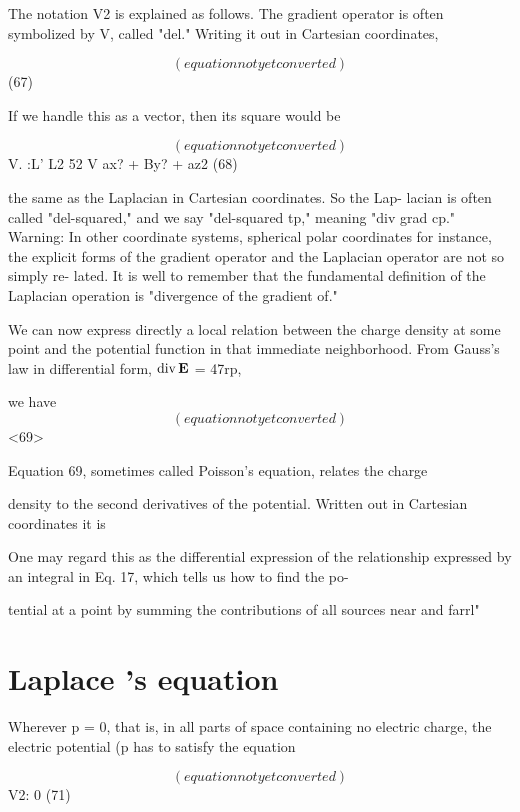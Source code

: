The notation V2 is explained as follows. The gradient operator is
often symbolized by V, called "del." Writing it out in Cartesian
coordinates,

\begin{equation}
(equation not yet converted)
\end{equation}
(67)

If we handle this as a vector, then its square would be

\begin{equation}
(equation not yet converted)
\end{equation}
V. :L' L2 52
V ax? + By? + az2 (68)

the same as the Laplacian in Cartesian coordinates. So the Lap-
lacian is often called "del-squared," and we say "del-squared tp,"
meaning "div grad cp." Warning: In other coordinate systems,
spherical polar coordinates for instance, the explicit forms of the
gradient operator and the Laplacian operator are not so simply re-
lated. It is well to remember that the fundamental definition of the
Laplacian operation is "divergence of the gradient of."

We can now express directly a local relation between the charge
density at some point and the potential function in that immediate
neighborhood. From Gauss's law in differential form, $\operatorname{div}\mathbf{E}$ = 47rp,

we have
\begin{equation}
(equation not yet converted)
\end{equation}
<69>

Equation 69, sometimes called Poisson's equation, relates the charge

density to the second derivatives of the potential. Written out in
Cartesian coordinates it is

One may regard this as the differential expression of the relationship
expressed by an integral in Eq. 17, which tells us how to find the po-

tential at a point by summing the contributions of all sources near
and farrl"

\section{Laplace 's equation}

Wherever p = 0, that is, in all parts of space containing no electric
charge, the electric potential (p has to satisfy the equation

\begin{equation}
(equation not yet converted)
\end{equation}
V2\pot: 0 (71)

